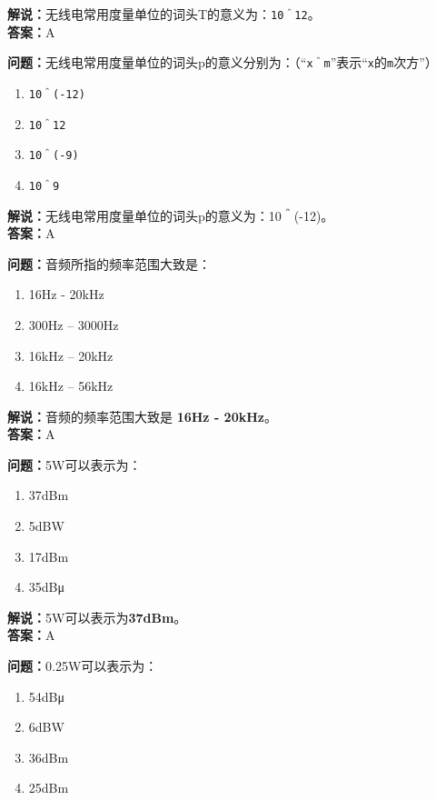 \textbf{解说：}无线电常用度量单位的词头T的意义为：\texttt{10＾12}。\\\textbf{答案：}A



\textbf{问题：}无线电常用度量单位的词头p的意义分别为：（“\texttt{x＾m}”表示“\texttt{x}的\texttt{m}次方”）

\begin{enumerate}[label=\Alph*), leftmargin=1cm]
	\item \texttt{10＾(-12)}
	\item \texttt{10＾12}
	\item \texttt{10＾(-9)}
	\item \texttt{10＾9}
\end{enumerate}

\textbf{解说：}无线电常用度量单位的词头p的意义为：10＾(-12)。\\\textbf{答案：}A



\textbf{问题：}音频所指的频率范围大致是：

\begin{enumerate}[label=\Alph*), leftmargin=1cm]
	\item 16Hz - 20kHz
	\item 300Hz – 3000Hz
	\item 16kHz – 20kHz
	\item 16kHz – 56kHz
\end{enumerate}

\textbf{解说：}音频的频率范围大致是 \textbf{16Hz - 20kHz}。\\\textbf{答案：}A%



\textbf{问题：}5W可以表示为：

\begin{enumerate}[label=\Alph*), leftmargin=1cm]
	\item 37dBm
	\item 5dBW
	\item 17dBm
	\item 35dBμ
\end{enumerate}

\textbf{解说：}5W可以表示为\textbf{37dBm}。\\\textbf{答案：}A %



\textbf{问题：}0.25W可以表示为：

\begin{enumerate}[label=\Alph*), leftmargin=1cm]
	\item 54dBμ
	\item 6dBW
	\item 36dBm
	\item 25dBm
\end{enumerate}

